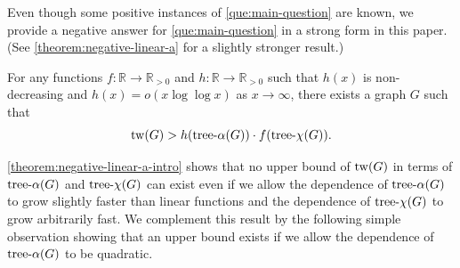 \documentclass[a4paper, cleveref, autoref, thm-restate]{lipics-v2021}
\newcommand{\T}{\mathcal{T}}
\newcommand{\twG}{{\rm tw}(G)}
\newcommand{\tw}{{\rm tw}}
\newcommand{\treeaG}{{\rm tree\textnormal{-}}\alpha(G)}
\newcommand{\treea}{{\rm tree}\textnormal{-}\alpha}
\newcommand{\treex}{{\rm tree}\textnormal{-}\chi}
\newcommand{\treexG}{{\rm tree\textnormal{-}}\chi(G)}
\begin{document}


Even though some positive instances of \cref{que:main-question} are known, we provide a negative answer for \cref{que:main-question} in a strong form in this paper.
(See \cref{theorem:negative-linear-a} for a slightly stronger result.)

\begin{theorem} \label{theorem:negative-linear-a-intro}
    For any functions $f\colon {\mathbb R} \rightarrow {\mathbb R}_{>0}$ and $h\colon {\mathbb R} \rightarrow {\mathbb R}_{>0}$ such that $h(x)$ is non-decreasing and $h(x) = o(x\log\log x)$ as $x \to \infty$,
    there exists a graph $G$ such that
    \[
        \tw(G) > h(\treea(G)) \cdot f(\treex(G))\text{.}
    \]
\end{theorem}

\cref{theorem:negative-linear-a-intro} shows that no upper bound of $\tw(G)$ in terms of $\treea(G)$ and $\treex(G)$ can exist even if we allow the dependence of $\treea(G)$ to grow slightly faster than linear functions and the dependence of $\treex(G)$ to grow arbitrarily fast. %
We complement this result by the following simple observation showing that an upper bound exists if we allow the dependence of $\treea(G)$ to be quadratic.
\end{document}
